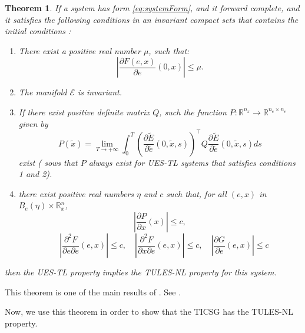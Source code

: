 \documentclass[letterpaper, 10 pt, conference]{ieeeconf}
\newtheorem{theorem}{Theorem}[section]
\begin{document}
\begin{theorem}\label{therem:TULESNL2UESTL}
If a  system  has form \eqref{eq:systemForm}, and it forward complete, and it satisfies the following conditions in an invariant  compact sets that contains the initial conditions : 
\begin{enumerate}
\item 
There exist a positive real number $\mu$, such that: 
$$
\left|\frac{\partial F(e,x)}{\partial e}(0,x)\right| \le \mu. 
$$
\label{condition1}
\item 
The manifold $\mathscr{E}$ is invariant.
\label{condition2}
\item
If there exist positive definite matrix $Q$, such the function $P:\mathbb{R}^{n_x}\to\mathbb{R}^{n_e \times n_e}$ given by
$$P\left(\tilde{x}\right)=\lim_{T \to+\infty} \int_0^T \left( \frac{\partial \tilde{E}}{\partial \tilde{e}}\left(0,\tilde{x},s\right)\right)^\top Q \frac{\partial \tilde{E}}{\partial \tilde{e}}\left(0,\tilde{x},s\right) ds$$
exist (\cite{AndrieuJayawardhanaPraly} sows that $P$ always exist for UES-TL systems that satisfies conditions 1 and 2).
 \label{condition3}
\item 
there exist positive real numbers $\eta$ and $c$ such that, for all $(e,x)$ in $B_e(\eta)\times \mathbb{R}^n_x$,
$$\left| \frac{\partial P}{\partial x}(x)\right| \le c,$$
$$\quad  \left| \frac{\partial^2 F}{\partial e \partial e}(e,x)\right| \le c, \quad  \left| \frac{\partial^2 F}{\partial x \partial e}(e,x)\right| \le c,\quad\left| \frac{\partial G}{\partial e}(e,x)\right| \le c$$
\label{condition4}
\end{enumerate}
then the UES-TL property implies the TULES-NL property for this system.
\end{theorem}

This theorem is one of the main results of \cite{AndrieuJayawardhanaPraly}. See \cite[Comment 2, p.3]{AndrieuJayawardhanaPraly}.

Now, we use this theorem in order to show that the TICSG has the TULES-NL property.
\end{document}
